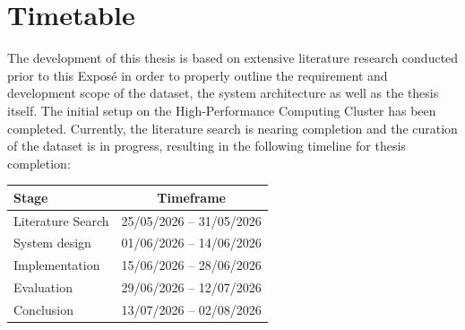 \chapter{Timetable}
\label{cha:Timetable}

The development of this thesis is based on extensive literature research conducted prior to this Exposé in order to properly outline the requirement and development scope of the dataset, the system architecture as well as the thesis itself. The initial setup on the High-Performance Computing Cluster has been completed. Currently, the literature search is nearing completion and the curation of the dataset is in progress, resulting in the following timeline for thesis completion:
\begin{table}[ht]
\label{tab:timetable}
\begin{tabular}{lc}
    \hline
    \textbf{Stage}      & \textbf{Timeframe}        \\ \hline
    Literature Search   & 25/05/2026 -- 31/05/2026  \\
    System design       & 01/06/2026 -- 14/06/2026  \\
    Implementation      & 15/06/2026 -- 28/06/2026  \\
    Evaluation          & 29/06/2026 -- 12/07/2026  \\
    Conclusion          & 13/07/2026 -- 02/08/2026                     
\end{tabular}%
\end{table}